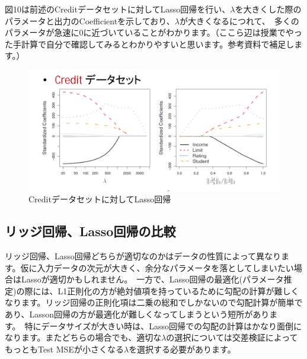 \documentclass[uplatex]{jsarticle}
\begin{document}
図10は前述のCreditデータセットに対してLasso回帰を行い、$\lambda$を大きくした際のパラメータと出力のCoefficientを示しており、$ \lambda$が大きくなるにつれて、\
多くのパラメータが急速に0に近づいていることがわかります。（ここら辺は授業でやった手計算で自分で確認してみるとわかりやすいと思います。参考資料で補足します。）
\begin{figure}
  \begin{center}
    \includegraphics[width=13cm]{img/lasso_lmd.png}
    \caption{Creditデータセットに対してLasso回帰}
  \end{center}
\end{figure}

\subsection{リッジ回帰、Lasso回帰の比較}
リッジ回帰、Lasso回帰どちらが適切なのかはデータの性質によって異なります。仮に入力データの次元が大きく、余分なパラメータを落としてしまいたい場合はLassoが適切かもしれません。\
一方で、Lasso回帰の最適化(パラメータ推定)の際には、L1正則化の方が絶対値項を持っているために勾配の計算が難しくなります。リッジ回帰の正則化項は二乗の総和でしかないので勾配計算が簡単であり、Lasson回帰の方が最適化が難しくなってしまうという短所があります。\
特にデータサイズが大きい時は、Lasso回帰での勾配の計算はかなり面倒になります。またどちらの場合でも、適切な$\lambda$の選択については交差検証によってもっともTest MSEが小さくなる$\lambda$を選択する必要があります。\

\end{document}
